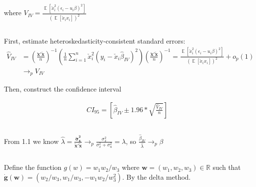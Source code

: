 \documentclass[12pt]{article}
\begin{document}
where $V_{IV} = \frac{\mathop{\mathbb{E}}[\check{x}_i^2(\epsilon_i- u_i\beta)^2]}{(\mathop{\mathbb{E}}[\check{x}_i x_i])^2}   $




\subsection{}


First, estimate heteroskedasticity-consistent standard errors:
\begin{equation}
\begin{split}
  \hat{V}_{IV} & = \left(\frac{\mathbf{\check{x}'\tilde{x}}}{n}\right)^{-1} \left(\frac{1}{n}\sum^n_{i=1}\check{x}_i^2(y_i-\check{x}_i\hat{\beta}_{IV})^2\right) \left(\frac{\mathbf{\check{x}'\tilde{x}}}{n}\right)^{-1}
   = \frac{\mathop{\mathbb{E}}[\check{x}_i^2(\epsilon_i- u_i\beta)^2]}{(\mathop{\mathbb{E}}[\check{x}_i x_i])^2} +o_p(1) \\
   & \rightarrow_p V_{IV}
\end{split}
\end{equation}


Then, construct the confidence interval

\begin{equation}
\begin{split}
  CI_{95} = \left[\hat{\beta}_{IV}  \pm 1.96 * \sqrt{\frac{\hat{V}_{IV}}{n}}\right]
\end{split}
\end{equation}

\newpage

\subsection{}

From 1.1 we know $ \hat{\lambda} = \frac{\mathbf{\check{\sigma}_x^2}}{\mathbf{\tilde{x}'\tilde{x}}} \rightarrow_p \frac{\sigma_x^2}{\sigma_x^2 + \sigma_u^2} = \lambda $, so $\frac{\hat{\beta}_{IV}}{\hat{\lambda}} \rightarrow_p \beta$

\subsection{}


Define the function $g(w) = w_1w_2/w_3$ where $\mathbf{w} = (w_1, w_2, w_3)\in\mathbb{R}$ such that $\mathbf{\dot{g}(w)} = (w_2/w_3,w_1/w_3,-w_1w_2/w_3^2)$. By the delta method.
\end{document}
